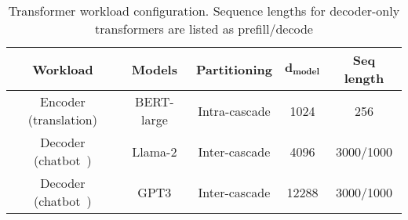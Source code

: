 \begin{table}[h]
\begin{scriptsize}
    \centering
    \caption{Transformer workload configuration. Sequence lengths for decoder-only transformers are listed as prefill/decode}
    \begin{tabular}{|c|c|c|c|c|}
    \hline
         \textbf{Workload} & \textbf{Models} & \textbf{Partitioning} & {$\mathbf{d_{model}}$} &
         \textbf{Seq length} \\\hline
         Encoder (translation) & BERT-large & Intra-cascade & 1024 & 256\\\hline
         Decoder (chatbot~\cite{genz}) & Llama-2 & Inter-cascade & 4096 & 3000/1000\\\hline
         Decoder (chatbot~\cite{genz}) & GPT3  & Inter-cascade & 12288 & 3000/1000\\\hline
          
    \end{tabular}
    \label{tables:workloads}
\end{scriptsize}
\end{table}